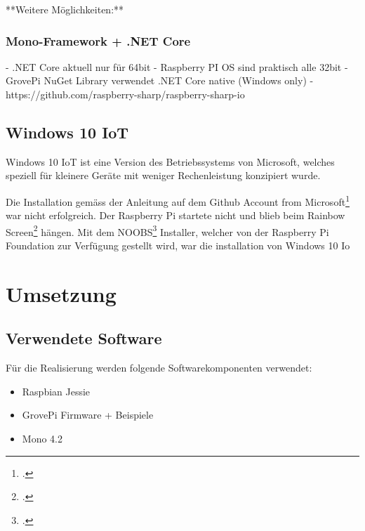 **Weitere Möglichkeiten:**

\subsubsection{Mono-Framework + .NET Core}
  - .NET Core aktuell nur für 64bit
  - Raspberry PI OS sind praktisch alle 32bit
  - GrovePi NuGet Library verwendet .NET Core native (Windows only)
  - https://github.com/raspberry-sharp/raspberry-sharp-io

\subsection{Windows 10 IoT}
Windows 10 IoT ist eine Version des Betriebssystems von Microsoft, welches speziell für kleinere Geräte mit weniger Rechenleistung konzipiert wurde.

Die Installation gemäss der Anleitung auf dem Github Account from Microsoft\footcite{install_win10iot_2016-04-25} war nicht erfolgreich. 
Der Raspberry Pi startete nicht und blieb beim Rainbow Screen\footcite{RPi_Rainbowscreen_2016-04-25} hängen. 
Mit dem NOOBS\footcite{NOOBS_2016-04-25} Installer, welcher von der Raspberry Pi Foundation zur Verfügung gestellt wird, war die installation von Windows 10 Io


\section{Umsetzung}

\subsection{Verwendete Software}
Für die Realisierung werden folgende Softwarekomponenten verwendet:

\begin{itemize}
\item Raspbian Jessie
\item GrovePi Firmware + Beispiele
\item Mono 4.2
\end{itemize}





